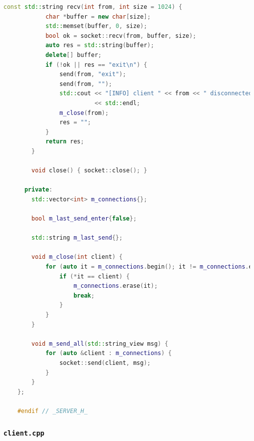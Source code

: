 \documentclass{article}
\begin{document}
\begin{lstlisting}[language=C++]
        const std::string recv(int from, int size = 1024) {
            char *buffer = new char[size];
            std::memset(buffer, 0, size);
            bool ok = socket::recv(from, buffer, size);
            auto res = std::string(buffer);
            delete[] buffer;
            if (!ok || res == "exit\n") {
                send(from, "exit");
                send(from, "");
                std::cout << "[INFO] client " << from << " disconnected"
                          << std::endl;
                m_close(from);
                res = "";
            }
            return res;
        }
    
        void close() { socket::close(); }
    
      private:
        std::vector<int> m_connections{};
    
        bool m_last_send_enter{false};
    
        std::string m_last_send{};
    
        void m_close(int client) {
            for (auto it = m_connections.begin(); it != m_connections.end(); ++it) {
                if (*it == client) {
                    m_connections.erase(it);
                    break;
                }
            }
        }
    
        void m_send_all(std::string_view msg) {
            for (auto &client : m_connections) {
                socket::send(client, msg);
            }
        }
    };
    
    #endif // _SERVER_H_    
\end{lstlisting}

\subsubsection{\texttt{client.cpp}}
\end{document}
